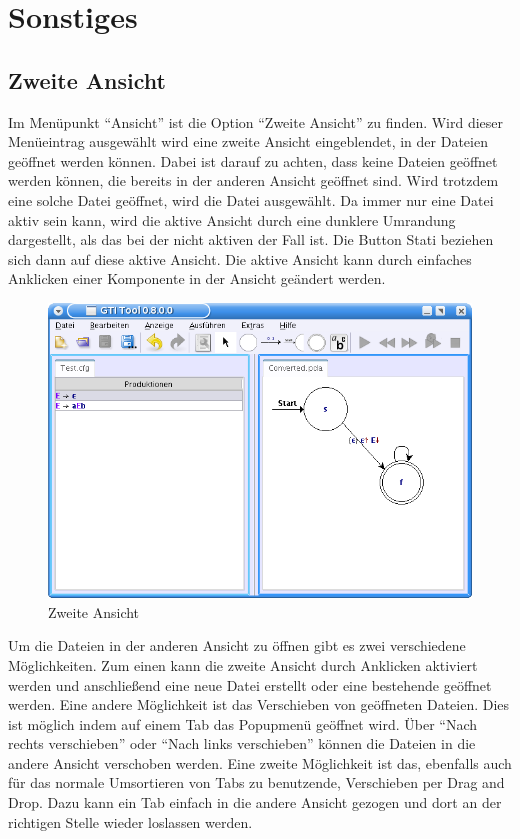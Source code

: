 \chapter{Sonstiges}


\section{Zweite Ansicht}

Im Menüpunkt "`Ansicht"' ist die Option "`Zweite Ansicht"' zu finden. Wird dieser
Menüeintrag ausgewählt wird eine zweite Ansicht eingeblendet, in der Dateien
geöffnet werden können. Dabei ist darauf zu achten, dass keine Dateien geöffnet
werden können, die bereits in der anderen Ansicht geöffnet sind. Wird trotzdem
eine solche Datei geöffnet, wird die Datei ausgewählt. Da immer nur eine Datei
aktiv sein kann, wird die aktive Ansicht durch eine dunklere Umrandung
dargestellt, als das bei der nicht aktiven der Fall ist. Die Button Stati
beziehen sich dann auf diese aktive Ansicht. Die aktive Ansicht kann durch
einfaches Anklicken einer Komponente in der Ansicht geändert werden.\vspace{10pt}

\begin{figure}[h]
\begin{center}
\includegraphics[width=12cm]{images/second_view.png}
\caption{Zweite Ansicht}
\end{center}
\end{figure}

Um die Dateien in der anderen Ansicht zu öffnen gibt es zwei verschiedene
Möglichkeiten. Zum einen kann die zweite Ansicht durch Anklicken aktiviert werden
und anschließend eine neue Datei erstellt oder eine bestehende geöffnet werden.
Eine andere Möglichkeit ist das Verschieben von geöffneten Dateien. Dies ist
möglich indem auf einem Tab das Popupmenü geöffnet wird. Über "`Nach rechts
verschieben"' oder "`Nach links verschieben"' können die Dateien in die andere
Ansicht verschoben werden. Eine zweite Möglichkeit ist das, ebenfalls auch für
das normale Umsortieren von Tabs zu benutzende, Verschieben per Drag and Drop.
Dazu kann ein Tab einfach in die andere Ansicht gezogen und dort an der richtigen
Stelle wieder loslassen werden.\vspace{10pt}

